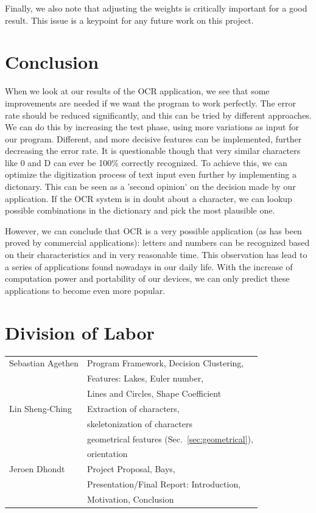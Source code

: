 \documentclass{article}
\begin{document}
Finally, we also note that adjusting the weights is critically important for a good result. This issue is a keypoint for any future work on this project.

\section{Conclusion}
\label{sec:conclusion}
When we look at our results of the OCR application, we see that some improvements are needed if we want the program to work perfectly. The error rate should be reduced significantly, and this can be tried by different approaches. We can do this by increasing the test phase, using more variations as input for our program. Different, and more decisive features can be implemented, further decreasing the error rate. It is questionable though that very similar characters like 0 and D can ever be 100\% correctly recognized. To achieve this, we can optimize the digitization process of text input even further by implementing a dictonary. This can be seen as a 'second opinion' on the decision made by our application. If the OCR system is in doubt about a character, we can lookup possible combinations in the dictionary and pick the most plausible one.

However, we can conclude that OCR is a very possible application (as has been proved by commercial applications): letters and numbers can be recognized based on their characteristics and in very reasonable time. This observation has lead to a series of applications found nowadays in our daily life. With the increase of computation power and portability of our devices, we can only predict these applications to become even more popular.

\section{Division of Labor}
\label{sec:division}
\begin{tabular}{|l|l|}
 \hline
 Sebastian Agethen & Program Framework, Decision Clustering, \\
  & Features: Lakes, Euler number, \\
 & Lines and Circles, Shape Coefficient\\
\hline
 Lin Sheng-Ching & Extraction of characters, \\
 &  skeletonization of characters\\
  & geometrical features (Sec.~\ref{sec:geometrical}), \\ & orientation \\
\hline
 Jeroen Dhondt & Project Proposal, Bays, \\
 & Presentation/Final Report: Introduction, \\
 & Motivation, Conclusion\\
\hline
\end{tabular}
\end{document}
